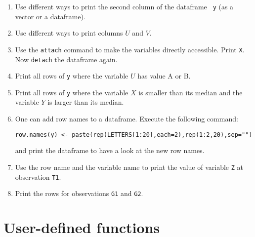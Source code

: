 \documentclass{article}
\begin{document}
\begin{enumerate}
\item Use different ways to print the second column of the dataframe \texttt{%
y} (as a vector or a data\-frame).

\item Use different ways to print columns $U$ and $V$.

\item Use the \texttt{attach} command to make the variables directly
accessible. Print \texttt{X}. Now \texttt{detach} the dataframe again.

\item Print all rows of \texttt{y} where the variable $U$ has value A or B.

\item Print all rows of \texttt{y} where the variable $X$ is smaller than
its median and the variable $Y$ is larger than its median.

\item One can add row names to a dataframe. Execute the following command:

\texttt{row.names(y) <-
paste(rep(LETTERS[1:20],each=2),rep(1:2,20),sep={}"}{}\texttt{")}

and print the dataframe to have a look at the new row names.

\item Use the row name and the variable name to print the value of variable 
\texttt{Z} at observation \texttt{T1}.

\item Print the rows for observations \texttt{G1} and \texttt{G2}.
\end{enumerate}

\newpage


\section{User-defined functions}
\end{document}

